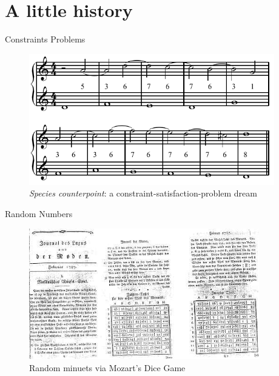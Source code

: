 \section{A little history}

\begin{frame}{Constraints Problems}
    \begin{figure}
    \begin{centering}
    \includegraphics[height=2.25in]{assets/include-species-counterpoint.png}
    \caption{\emph{Species counterpoint}: a constraint-satisfaction-problem dream}
    \end{centering}
    \end{figure}
\end{frame}

\begin{frame}{Random Numbers}
    \begin{figure}
    \begin{centering}
    \includegraphics[height=2.25in]{assets/include-dice-game.jpg}
    \caption{Random minuets via Mozart's Dice Game}
    \end{centering}
    \end{figure}
\end{frame}

